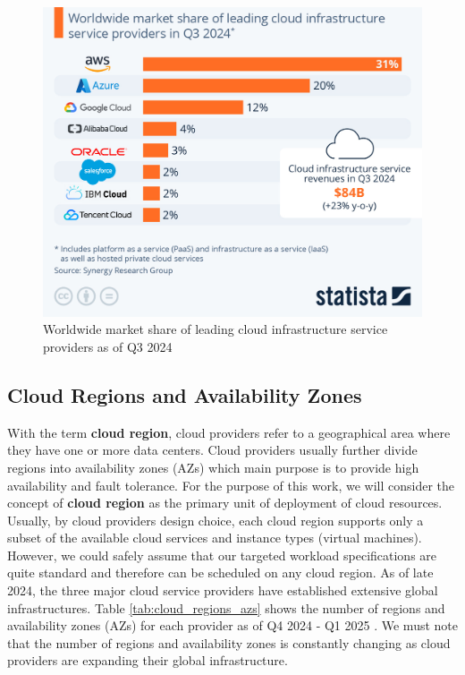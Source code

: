 \begin{figure}[htb]
    \centering
    \includegraphics[width=0.75\linewidth]{images/pcp.jpeg}
    \caption{Worldwide market share of leading cloud infrastructure service providers as of Q3 2024 \cite{statista_cloud_market_share}}
    \label{fig:pcp}
\end{figure}
  
\subsection{Cloud Regions and Availability Zones}

With the term \textbf{cloud region}, cloud providers refer to a geographical area where they have one or more data centers.
Cloud providers usually further divide regions into availability zones (AZs) which main purpose is to provide high availability and fault tolerance.
For the purpose of this work, we will consider the concept of \textbf{cloud region} as the primary unit of deployment of cloud resources.
Usually, by cloud providers design choice, each cloud region supports only a subset of the available cloud services and instance types (virtual machines).
However, we could safely assume that our targeted workload specifications are quite standard and therefore can be scheduled on any cloud region.
As of late 2024, the three major cloud service providers have established extensive global infrastructures.
Table \ref{tab:cloud_regions_azs} shows the number of regions and availability zones (AZs) for each provider as of Q4 2024 - Q1 2025
\cite{statista_cloud_regions} \cite{aws_infrastructure}.
We must note that the number of regions and availability zones is constantly changing as cloud providers are expanding their global infrastructure.

